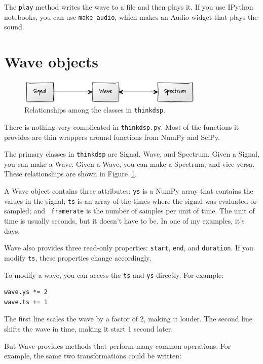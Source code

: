 \documentclass[12pt]{book}
\begin{document}
The {\tt play} method writes the wave to a file and then plays it.
If you use IPython notebooks, you can use \verb"make_audio", which
makes an Audio widget that plays the sound.


\section{Wave objects}

\begin{figure}
\centerline{\includegraphics[width=3.5in]{figs/diagram1.pdf}}
\caption{Relationships among the classes in {\tt thinkdsp}.}
\label{fig.diagram1}
\end{figure}

There is nothing very complicated in {\tt thinkdsp.py}.  Most
of the functions it provides are thin wrappers around functions
from NumPy and SciPy.

The primary classes in {\tt thinkdsp} are Signal, Wave, and Spectrum.
Given a Signal, you can make a Wave.  Given a Wave, you can
make a Spectrum, and vice versa.  These relationships are shown
in Figure~\ref{fig.diagram1}.

A Wave object contains three attributes: {\tt ys} is a NumPy array
that contains the values in the signal; {\tt ts} is an array of the
times where the signal was evaluated or sampled; and {\tt
  framerate} is the number of samples per unit of time.  The
unit of time is usually seconds, but it doesn't have to be.  In
one of my examples, it's days.

Wave also provides three read-only properties: {\tt start},
{\tt end}, and {\tt duration}.  If you modify {\tt ts}, these
properties change accordingly.

To modify a wave, you can access the {\tt ts} and {\tt ys} directly.
For example:

\begin{verbatim}
wave.ys *= 2
wave.ts += 1
\end{verbatim} 

The first line scales the wave by a factor of 2, making
it louder.  The second line shifts the wave in time, making it
start 1 second later.

But Wave provides methods that perform many common operations.
For example, the same two transformations could be written:
\end{document}
